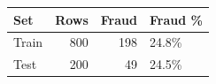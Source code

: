 \begin{tabular}{lrrl}
\toprule
Set & Rows & Fraud & Fraud \% \\
\midrule
Train & 800 & 198 & 24.8\% \\
Test & 200 & 49 & 24.5\% \\
\bottomrule
\end{tabular}
